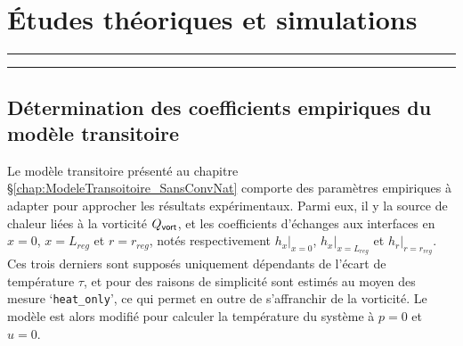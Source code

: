 \chapter{\'Etudes théoriques et simulations}
\vfill
\hrule \vspace{.5cm}
{\hypersetup{linkcolor = black}
\localtableofcontents
}%
\vspace{.5cm} \hrule
\vfill
\clearpage

\section{Détermination des coefficients empiriques du modèle transitoire}

Le modèle transitoire présenté au chapitre §\ref{chap:ModeleTransoitoire_SansConvNat} comporte des paramètres empiriques à adapter pour approcher les résultats expérimentaux. Parmi eux, il y la source de chaleur liées à la vorticité $Q_{\sf vort}$, et les coefficients d'échanges aux interfaces en $x=0$, $x=L_{reg}$ et $r=r_{reg}$, notés respectivement $h_{x}|_{x=0}$, $h_{x}|_{x=L_{reg}}$ et $h_{r}|_{r=r_{reg}}$. Ces trois derniers sont supposés uniquement dépendants de l'écart de température $\tau$, et pour des raisons de simplicité sont estimés au moyen des mesure `\texttt{heat\_only}', ce qui permet en outre de s'affranchir de la vorticité. Le modèle est alors modifié pour calculer la température du système à $p=0$ et $u=0$.